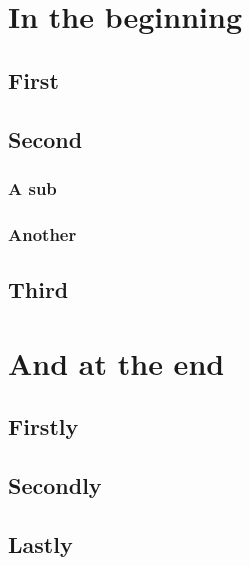 \documentclass[12pt]{report}
\begin{document}
\dominitoc

\tableofcontents

\chapter{In the beginning}
\minitoc

\section{First}
\section{Second}
\subsection{A sub}
\subsection{Another}
\section{Third}

\chapter{And at the end}
\minitoc

\section{Firstly}
\section{Secondly}
\section{Lastly}
\end{document}
